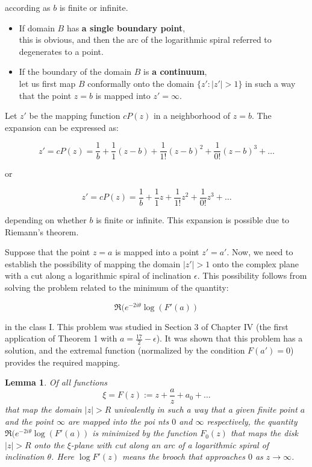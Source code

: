 \documentclass[
]{book}
\newtheorem{lemma}{Lemma}[chapter]
\theoremstyle{definition}
\theoremstyle{definition}
\theoremstyle{definition}
\theoremstyle{definition}
\theoremstyle{remark}
\begin{document}
according as \(b\) is finite or infinite.

\begin{itemize}
\item
  If domain \(B\) has \textbf{a single boundary point},\\
  this is obvious, and then the arc of the logarithmic spiral referred to degenerates to a point.
\item
  If the boundary of the domain \(B\) is \textbf{a continuum},\\
  let us first map \(B\) conformally onto the domain \(\{z' : |z'| > 1\}\) in such a way that the point \(z = b\) is mapped into \(z' = \infty\).
\end{itemize}

Let \(z'\) be the mapping function \(cP(z)\) in a neighborhood of \(z = b\). The expansion can be expressed as:

\[
z' = cP(z) = \frac{1}{b} + \frac{1}{1} (z - b) + \frac{1}{1!} (z - b)^2 + \frac{1}{0!} (z - b)^3 + \ldots
\]

or

\[
z' = cP(z) = \frac{1}{b} + \frac{1}{1}z + \frac{1}{1!}z^2 + \frac{1}{0!}z^3 + \ldots
\]

depending on whether \(b\) is finite or infinite. This expansion is possible due to Riemann's theorem.

Suppose that the point \(z = a\) is mapped into a point \(z' = a'\). Now, we need to establish the possibility of mapping the domain \(\lvert z' \rvert > 1\) onto the complex plane with a cut along a logarithmic spiral of inclination \(\epsilon\). This possibility follows from solving the problem related to the minimum of the quantity:

\[
 \Re(e^{-2i\theta} \log (F'(a))
\]

in the class I. This problem was studied in Section 3 of Chapter IV (the first application of Theorem 1 with \(a = \frac{17}{2} - \epsilon\)). It was shown that this problem has a solution, and the extremal function (normalized by the condition \(F(a') = 0\)) provides the required mapping.

\begin{lemma}
\protect\hypertarget{lem:unnamed-chunk-70}{}\label{lem:unnamed-chunk-70}Of all functions
\[
\xi=F(z) := z + \frac{a}{z} + a_0 + \ldots
\]
that map the domain \(|z| > R\) univalently in such a way that a given finite point \(a\) and the point \(\infty\) are
mapped into the poi nts \(0\) and \(\infty\) respectively, the quantity \(\Re(e^{-2i\theta} \log (F'(a))\)
is minimized by the function \(F_0(z)\) that maps the disk \(|z| > R\) onto the \(\xi\)-plane with cut along an arc of a logarithmic spiral of inclination \(\theta\). Here \(\log F '(z)\) means the brooch that approaches \(0\) as \(z \to \infty\).
\end{lemma}
\end{document}

